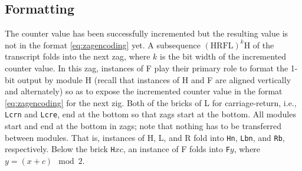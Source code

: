 \documentclass[twocolumn]{svjour3}
\begin{document}
\subsection{Formatting}
The counter value has been successfully incremented but the resulting value is not in the format \eqref{eq:zagencoding} yet.
A subsequence $(\mathrm{HRFL})^k \mathrm{H}$ of the transcript folds into the next zag, where $k$ is the bit width of the incremented counter value.
In this zag, instances of F play their primary role to format the 1-bit output by module H (recall that instances of H and F are aligned vertically and alternately) so as to expose the incremented counter value in the format \eqref{eq:zagencoding} for the next zig.
Both of the bricks of L for carriage-return, i.e., \texttt{Lcrn} and \texttt{Lcre}, end at the bottom so that zags start at the bottom.
All modules start and end at the bottom in zags; note that nothing has to be transferred between modules.
That is, instances of H, L, and R fold into \texttt{Hn}, \texttt{Lbn}, and \texttt{Rb}, respectively.
Below the brick \texttt{H}$xc$, an instance of F folds into \texttt{F}$y$, where $y = (x+c) \mod 2$.

%
\end{document}
